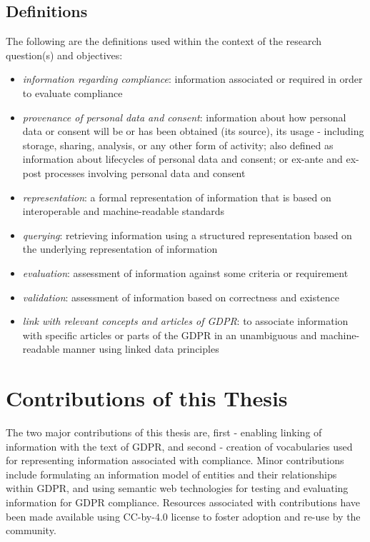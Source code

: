 \subsection{Definitions}
The following are the definitions used within the context of the research question(s) and objectives:
\begin{itemize}
    \item \textit{information regarding compliance}: information associated or required in order to evaluate compliance
    \item \textit{provenance of personal data and consent}: information about how personal data or consent will be or has been obtained (its source), its usage - including storage, sharing, analysis, or any other form of activity; also defined as information about lifecycles of personal data and consent; or ex-ante and ex-post processes involving personal data and consent
    \item \textit{representation}: a formal representation of information that is based on interoperable and machine-readable standards
    \item \textit{querying}: retrieving information using a structured representation based on the underlying representation of information
    \item \textit{evaluation}: assessment of information against some criteria or requirement
    \item \textit{validation}: assessment of information based on correctness and existence
    \item \textit{link with relevant concepts and articles of GDPR}: to associate information with specific articles or parts of the GDPR in an unambiguous and machine-readable manner using linked data principles
\end{itemize}

\section{Contributions of this Thesis}\label{sec:intro-contributions}
The two major contributions of this thesis are, first - enabling linking of information with the text of GDPR, and second - creation of vocabularies used for representing information associated with compliance. Minor contributions include formulating an information model of entities and their relationships within GDPR, and using semantic web technologies for testing and evaluating information for GDPR compliance. Resources associated with contributions have been made available using CC-by-4.0 license to foster adoption and re-use by the community.

